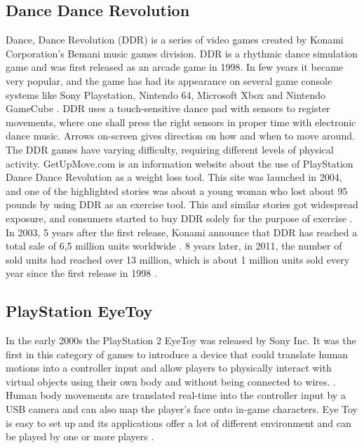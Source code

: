 \subsection{Dance Dance Revolution}
Dance, Dance Revolution (DDR) is a series of video games created by Konami Corporation’s Bemani music games division. DDR is a rhythmic dance simulation game and was first released as an arcade game in 1998. In few years it became very popular, and the game has had its appearance on several game console systems like Sony Playstation, Nintendo 64, Microsoft Xbox and Nintendo GameCube \cite{bogost2005rhetoric}. DDR uses a touch-sensitive dance pad with sensors to register movements, where one shall press the right sensors in proper time with electronic dance music. Arrows on-screen gives direction on how and when to move around. The DDR games have varying difficulty, requiring different levels of physical activity. GetUpMove.com is an information website about the use of PlayStation Dance Dance Revolution as a weight loss tool. This site was launched in 2004, and one of the highlighted stories was about a young woman who lost about 95 pounds by using DDR as an exercise tool. This and similar stories got widespread exposure, and consumers started to buy DDR solely for the purpose of exercise \cite{bogost2005rhetoric}. In 2003, 5 years after the first release, Konami announce that DDR has reached a total sale of 6,5 million units worldwide \cite{gamespot}. 8 years later, in 2011, the number of sold units had reached over 13 million, which is  about 1 million units sold every year since the first release in 1998 \cite{gaygamer}. 

\subsection{PlayStation EyeToy}
In the early 2000s the PlayStation 2 EyeToy was released by Sony Inc. It was the first in this category of games to introduce a device that could translate human motions into a controller input and allow players to physically interact with virtual objects using their own body and without being connected to wires. \cite{eyetoy}. Human body movements are translated real-time into the controller input by a USB camera  and can also map the player’s face onto in-game characters. Eye Toy is easy to set up and its applications offer a lot of different environment and can be played by one or more players \cite{eyetoyrehab}.

